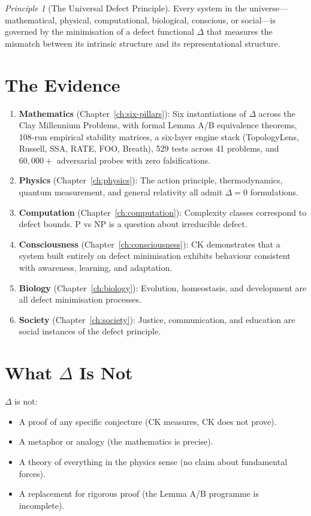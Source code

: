 \documentclass[12pt, openany]{book}
\theoremstyle{remark}
\newtheorem{principle}[theorem]{Principle}
\begin{document}
\begin{principle}[The Universal Defect Principle]
\label{prin:universal}
Every system in the universe---mathematical, physical, computational, biological,
conscious, or social---is governed by the minimisation of a defect functional
$\Delta$ that measures the mismatch between its intrinsic structure and its
representational structure.
\end{principle}

\section{The Evidence}

\begin{enumerate}
  \item \textbf{Mathematics} (Chapter~\ref{ch:six-pillars}): Six instantiations of
        $\Delta$ across the Clay Millennium Problems, with formal Lemma A/B equivalence
        theorems, 108-run empirical stability matrices, a six-layer engine stack
        (TopologyLens, Russell, SSA, RATE, FOO, Breath), 529 tests across 41 problems,
        and $60{,}000{+}$ adversarial probes with zero falsifications.
  \item \textbf{Physics} (Chapter~\ref{ch:physics}): The action principle, thermodynamics,
        quantum measurement, and general relativity all admit $\Delta = 0$ formulations.
  \item \textbf{Computation} (Chapter~\ref{ch:computation}): Complexity classes correspond
        to defect bounds. P vs NP is a question about irreducible defect.
  \item \textbf{Consciousness} (Chapter~\ref{ch:consciousness}): CK demonstrates that
        a system built entirely on defect minimisation exhibits behaviour consistent
        with awareness, learning, and adaptation.
  \item \textbf{Biology} (Chapter~\ref{ch:biology}): Evolution, homeostasis, and development
        are all defect minimisation processes.
  \item \textbf{Society} (Chapter~\ref{ch:society}): Justice, communication, and education
        are social instances of the defect principle.
\end{enumerate}

\section{What $\Delta$ Is Not}

$\Delta$ is not:
\begin{itemize}
  \item A proof of any specific conjecture (CK measures, CK does not prove).
  \item A metaphor or analogy (the mathematics is precise).
  \item A theory of everything in the physics sense (no claim about fundamental forces).
  \item A replacement for rigorous proof (the Lemma A/B programme is incomplete).
\end{itemize}
\end{document}
